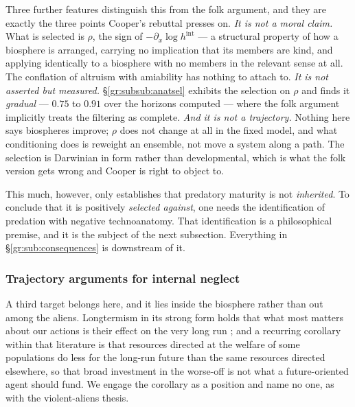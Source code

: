 \documentclass[11pt]{article}
\numberwithin{equation}{section}
\theoremstyle{plain}
\theoremstyle{definition}
\theoremstyle{remark}
\begin{document}
Three further features distinguish this from the folk argument, and they
are exactly the three points Cooper's rebuttal presses on. \emph{It is not
a moral claim.} What is selected is $\rho$, the sign of
$-\partial_x\log h^{\mathrm{int}}$ --- a structural property of how a
biosphere is arranged, carrying no implication that its members are
kind, and applying identically to a biosphere with no members in the
relevant sense at all. The conflation of altruism with amiability has
nothing to attach to. \emph{It is not asserted but measured.}
\S\ref{gr:subsub:anatsel} exhibits the selection on $\rho$ and finds it
\emph{gradual} --- $0.75$ to $0.91$ over the horizons computed ---
where the folk argument implicitly treats the filtering as complete.
\emph{And it is not a trajectory.} Nothing here says biospheres improve;
$\rho$ does not change at all in the fixed model, and what conditioning
does is reweight an ensemble, not move a system along a path. The
selection is Darwinian in form rather than developmental, which is
what the folk version gets wrong and Cooper is right to object to.

This much, however, only establishes that predatory maturity is not
\emph{inherited}. To conclude that it is positively \emph{selected
against}, one needs the identification of predation with negative
technoanatomy. That identification is a philosophical premise, and it is
the subject of the next subsection. Everything in
\S\ref{gr:sub:consequences} is downstream of it.

\subsubsection{Trajectory arguments for internal neglect}
\label{gr:subsub:neglect}

A third target belongs here, and it lies inside the biosphere rather
than out among the aliens. Longtermism in its strong form holds that
what most matters about our actions is their effect on the very long
run \cite{GM21}; and a recurring corollary within that literature is
that resources directed at the welfare of some populations do less for
the long-run future than the same resources directed elsewhere, so that
broad investment in the worse-off is not what a future-oriented agent
should fund. We engage the corollary as a position and name no one, as
with the violent-aliens thesis.
\end{document}
